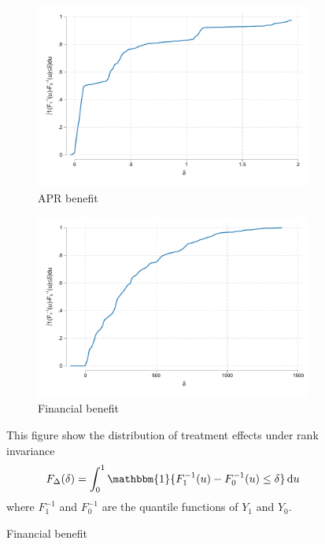 \begin{figure}[H]
    \begin{center}
       \begin{subfigure}{0.49\textwidth}
        \caption{APR benefit}
        \centering
        \includegraphics[width=\textwidth]{Figuras/te_rankinvariance_apr.pdf}
    \end{subfigure} 
   \begin{subfigure}{0.49\textwidth}
        \caption{Financial benefit}
        \centering
        \includegraphics[width=\textwidth]{Figuras/te_rankinvariance_fc_admin.pdf}
    \end{subfigure} 
    \end{center}
    \scriptsize This figure show the distribution of treatment effects under rank invariance
    \[F_\Delta(\delta) = \int_0^1 \mathbbm{1}\{ F_1^{-1}(u) - F_0^{-1}(u)\leq \delta\}\,\mathrm{d}u\]
where $F_1^{-1}$ and $F_0^{-1}$ are the quantile functions of $Y_1$ and $Y_0$.
\end{figure}


